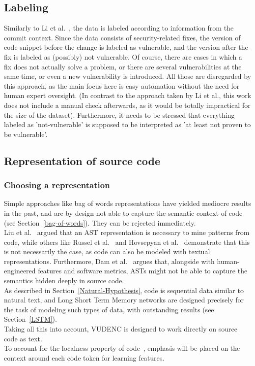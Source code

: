 \documentclass[
a4paper,
pagesize,
pdftex,
12pt,
twoside, %
BCOR=5mm, %
ngerman,
fleqn,
final,
]{scrartcl}
\begin{document}
	
	\subsection{Labeling}
	Similarly to Li et al.~\cite{Li.2018}, the data is labeled according to information from the commit context. Since the data consists of security-related fixes, the version of code snippet before the change is labeled as vulnerable, and the version after the fix is labeled as (possibly) not vulnerable. Of course, there are cases in which a fix does not actually solve a problem, or there are several vulnerabilities at the same time, or even a new vulnerability is introduced. All those are disregarded by this approach, as the main focus here is easy automation without the need for human expert oversight. (In contrast to the approach taken by Li et al., this work does not include a manual check afterwards, as it would be totally impractical for the size of the dataset). Furthermore, it needs to be stressed that everything labeled as 'not-vulnerable' is supposed to be interpreted as 'at least not proven to be vulnerable'.
	
	\subsection{Representation of source code}
	
	\subsubsection{Choosing a representation}
	Simple approaches like bag of words representations have yielded mediocre results in the past, and are by design not able to capture the semantic context of code (see Section~\ref{bag-of-words}). They can be rejected immediately.\\
	Liu et al.~\cite{Liu.2018} argued that an AST representation is necessary to mine patterns from code, while others like Russel et al.~\cite{Russell.2018} and Hovsepyan et al.~\cite{Hovsepyan.2012} demonstrate that this is not necessarily the case, as code can also be modeled with textual representations. Furthermore, Dam et al.~\cite{Dam.2016} argues that, alongside with human-engineered features and software metrics, ASTs might not be able to capture the semantics hidden deeply in source code.\\
	As described in Section~\ref{Natural-Hypothesis}, code is sequential data similar to natural text, and Long Short Term Memory networks are designed precisely for the task of modeling such types of data, with outstanding results (see Section~\ref{LSTM}).\\
	Taking all this into account, VUDENC is designed to work directly on source code as text.\\
	To account for the localness property of code~\cite{Tu.2014}, emphasis will be placed on the context around each code token for learning features.
	
\end{document}
